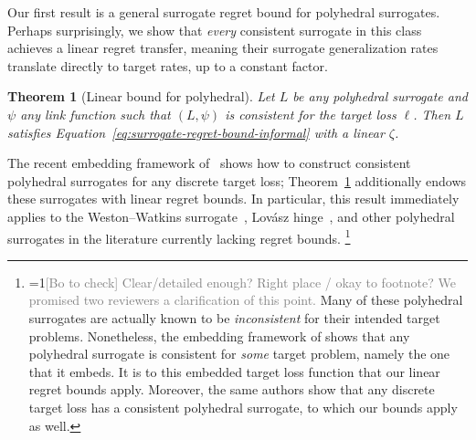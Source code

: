 \documentclass{article}
\newtheorem{theorem}{Theorem}
\theoremstyle{definition}\newtheorem{definition}{Definition}
\theoremstyle{definition}\newtheorem{assumption}{Assumption}
\newcommand{\Comments}{1}
\newcommand{\mynote}[2]{\ifnum\Comments=1\textcolor{#1}{#2}\fi}
\newcommand{\bo}[1]{\mynote{blue}{[Bo: #1]}}
\newcommand{\bocheck}[1]{\mynote{gray}{[Bo to check] #1}}
\begin{document}
Our first result is a general surrogate regret bound for polyhedral surrogates.
Perhaps surprisingly, we show that \emph{every} consistent surrogate in this class achieves a linear regret transfer, meaning their surrogate generalization rates translate directly to target rates, up to a constant factor.
\begin{theorem}[Linear bound for polyhedral]
  \label{thm:main-upper}
  Let $L$ be any polyhedral surrogate and $\psi$ any link function such that $(L,\psi)$ is consistent for the target loss $\ell$.
  Then $L$ satisfies Equation~\ref{eq:surrogate-regret-bound-informal} with a linear $\zeta$.
\end{theorem}
The recent embedding framework of~\citet{finocchiaro2019embedding} shows how to construct consistent polyhedral surrogates for any discrete target loss; Theorem~\ref{thm:main-upper} additionally endows these surrogates with linear regret bounds.
In particular, this result immediately applies to the Weston--Watkins surrogate~\cite{wang2020weston}, Lov\'asz hinge~\cite{yu2018lovasz,finocchiaro2019embedding}, and other polyhedral surrogates in the literature currently lacking regret bounds.%
\footnote{\bocheck{Clear/detailed enough?  Right place / okay to footnote?  We promised two reviewers a clarification of this point.}
  Many of these polyhedral surrogates are actually known to be \emph{inconsistent} for their intended target problems.
  Nonetheless, the embedding framework of \citet{finocchiaro2019embedding} shows that any polyhedral surrogate is consistent for \emph{some} target problem, namely the one that it embeds.
  It is to this embedded target loss function that our linear regret bounds apply.
Moreover, the same authors show that any discrete target loss has a consistent polyhedral surrogate, to which our bounds apply as well.}
\end{document}
